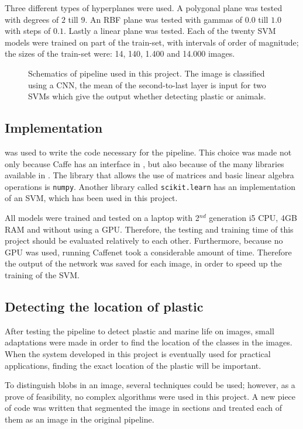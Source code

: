Three different types of hyperplanes were used.
A polygonal plane was tested with degrees of $2$ till $9$.
An RBF plane was tested with gammas of $0.0$ till $1.0$ with steps of $0.1$.
Lastly a linear plane was tested.
Each of the twenty SVM models were trained on part of the train-set, with intervals of order of magnitude; the sizes of the train-set were: 14, 140, 1.400 and 14.000 images.

\begin{figure}
\centering
\ifx\showfig\undefined
 \fi
\caption{Schematics of pipeline used in this project. The image is classified using a CNN, the mean of the second-to-last layer is input for two SVMs which give the output whether detecting plastic or animals.}
\label{fig:pipeline}
\end{figure}


\subsection{Implementation}
\label{sec:Method-implementation}
{\Python} was used to write the code necessary for the pipeline.
This choice was made not only because Caffe has an interface in \Python, but also because of the many libraries available in \Python.
The library that allows the use of matrices and basic linear algebra operations is \texttt{numpy}.
Another library called \texttt{scikit.learn} has an implementation of an SVM, which has been used in this project.

All models were trained and tested on a laptop with 2$^{nd}$ generation i5 CPU, 4GB RAM and without using a GPU. Therefore, the testing and training time of this project should be evaluated relatively to each other.
Furthermore, because no GPU was used, running Caffenet took a considerable amount of time. Therefore the output of the network was saved for each image, in order to speed up the training of the SVM.

\subsection{Detecting the location of plastic}
\label{sec:Method-location}
After testing the pipeline to detect plastic and marine life on images, small adaptations were made in order to find the location of the classes in the images.
When the system developed in this project is eventually used for practical applications, finding the exact location of the plastic will be important.

To distinguish blobs in an image, several techniques could be used; however, as a prove of feasibility, no complex algorithms were used in this project.
A new piece of code was written that segmented the image in sections and treated each of them as an image in the original pipeline.

